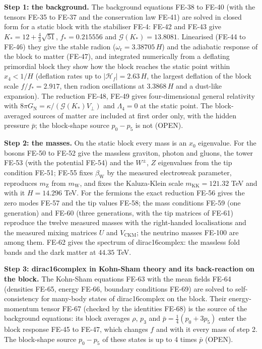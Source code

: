 \documentclass[
  10pt,
]{article}
\begin{document}
\textbf{Step 1: the background.} The background equations FE-38 to FE-40
(with the tensors FE-35 to FE-37 and the conservation law FE-41) are
solved in closed form for a static block with the stabiliser FE-4: FE-42
and FE-43 give \(K_* = 12 + \frac43\sqrt{51}\), \(f_* = 0.215556\) and
\(\mathcal{G}(K_*) = 13.8081\). Linearised (FE-44 to FE-46) they give
the stable radion (\(\omega_{\mathrm{r}} = 3.38705\,H\)) and the
adiabatic response of the block to matter (FE-47), and integrated
numerically from a deflating primordial block they show how the block
reaches the static point within \(x_4 < 1/H\) (deflation rates up to
\(\lvert\mathcal{H}_f\rvert = 2.63\,H\), the largest deflation of the
block scale \(f/f_* = 2.917\), then radion oscillations at \(3.3868\,H\)
and a dust-like expansion). The reduction FE-48, FE-49 gives
four-dimensional general relativity with
\(8\pi G_{\mathrm{N}} = \kappa/(\mathcal{G}(K_*)V_\perp)\) and
\(\Lambda_4 = 0\) at the static point. The block-averaged sources of
matter are included at first order only, with the hidden pressure
\(\bar p\); the block-shape source \(p_0 - p_5\) is not (OPEN).

\textbf{Step 2: the masses.} On the static block every mass is an
\(x_0\) eigenvalue. For the bosons FE-50 to FE-52 give the massless
graviton, photon and gluons, the tower FE-53 (with the potential FE-54)
and the \(W^\pm\), \(Z\) eigenvalues from the tip condition FE-51; FE-55
fixes \(\beta_{\mathrm{W}}\) by the measured electroweak parameter,
reproduces \(m_{\mathrm{Z}}\) from \(m_{\mathrm{W}}\), and fixes the
Kaluza-Klein scale \(m_{\mathrm{KK}} = 121.32\) TeV and with it
\(H = 14.296\) TeV. For the fermions the exact reduction FE-56 gives the
zero modes FE-57 and the tip values FE-58; the mass conditions FE-59
(one generation) and FE-60 (three generations, with the tip matrices of
FE-61) reproduce the twelve measured masses with the right-handed
localisations and the measured mixing matrices \(U\) and
\(V_{\mathrm{CKM}}\); the neutrino masses FE-100 are among them. FE-62
gives the spectrum of dirac16complex: the massless fold bands and the
dark matter at \(44.35\) TeV.

\textbf{Step 3: dirac16complex in Kohn-Sham theory and its back-reaction
on the block.} The Kohn-Sham equations FE-63 with the mean fields FE-64
(densities FE-65, energy FE-66, boundary conditions FE-69) are solved to
self-consistency for many-body states of dirac16complex on the block.
Their energy-momentum tensor FE-67 (checked by the identities FE-68) is
the source of the background equations: its block averages \(\rho\),
\(p_3\) and \(\bar p = \frac14(p_0 + 3p_5)\) enter the block response
FE-45 to FE-47, which changes \(f\) and with it every mass of step 2.
The block-shape source \(p_0 - p_5\) of these states is up to 4 times
\(\bar p\) (OPEN).
\end{document}
